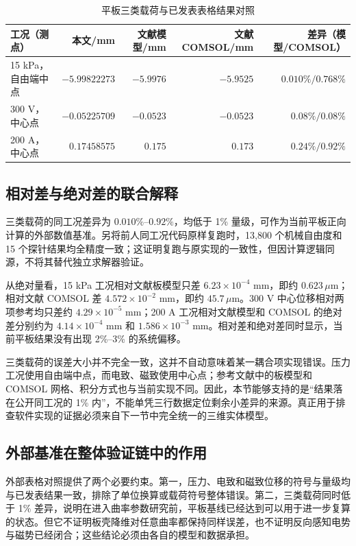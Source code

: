\documentclass[UTF8,fontset=windows,11pt,a4paper]{ctexart}
\begin{document}
\begin{table}[H]
\centering
\caption{平板三类载荷与已发表表格结果对照}
\label{tab:published_flat_benchmark}
\small
\begin{tabular}{@{}lrrrr@{}}
\toprule
工况（测点） & 本文/mm & 文献模型/mm & 文献 COMSOL/mm & 差异（模型/COMSOL） \\
\midrule
15 kPa，自由端中点 & $-5.99822273$ & $-5.9976$ & $-5.9525$ & $0.010\%/0.768\%$ \\
300 V，中心点 & $-0.05225709$ & $-0.0523$ & $-0.0523$ & $0.08\%/0.08\%$ \\
200 A，中心点 & $0.17458575$ & $0.175$ & $0.173$ & $0.24\%/0.92\%$ \\
\bottomrule
\end{tabular}
\end{table}

\subsection{相对差与绝对差的联合解释}

三类载荷的同工况差异为 $0.010\%$--$0.92\%$，均低于 1\% 量级，可作为当前平板正向计算的外部数值基准。另将前人同工况代码原样复跑时，13,800 个机械自由度和 15 个探针结果均全精度一致；这证明复跑与原实现的一致性，但因计算逻辑同源，不将其替代独立求解器验证。

从绝对量看，15 kPa 工况相对文献板模型只差 $6.23\times10^{-4}$ mm，即约 $0.623\,\mu$m；相对文献 COMSOL 差 $4.572\times10^{-2}$ mm，即约 $45.7\,\mu$m。300 V 中心位移相对两项参考均只差约 $4.29\times10^{-5}$ mm；200 A 工况相对文献模型和 COMSOL 的绝对差分别约为 $4.14\times10^{-4}$ mm 和 $1.586\times10^{-3}$ mm。相对差和绝对差同时显示，当前平板结果没有出现 2\%--3\% 的系统偏移。

三类载荷的误差大小并不完全一致，这并不自动意味着某一耦合项实现错误。压力工况使用自由端中点，而电致、磁致使用中心点；参考文献中的板模型和 COMSOL 网格、积分方式也与当前实现不同。因此，本节能够支持的是“结果落在公开同工况的 1\% 内”，不能单凭三行数据定位剩余小差异的来源。真正用于排查软件实现的证据必须来自下一节中完全统一的三维实体模型。

\subsection{外部基准在整体验证链中的作用}

外部表格对照提供了两个必要约束。第一，压力、电致和磁致位移的符号与量级均与已发表结果一致，排除了单位换算或载荷符号整体错误。第二，三类载荷同时低于 1\% 差异，说明在进入曲率参数研究前，平板基线已经达到可以用于进一步复算的状态。但它不证明板壳降维对任意曲率都保持同样误差，也不证明反向感知电势与磁势已经闭合；这些结论必须由各自的模型和数据承担。
\end{document}
